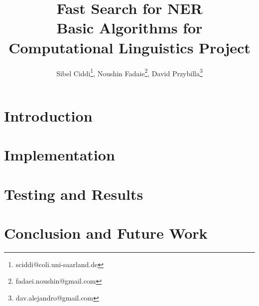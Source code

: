 \documentclass[4pt,a4paper]{article}
\author{Sibel Ciddi\footnote{sciddi@coli.uni-saarland.de},\hspace{5 mm} Noushin Fadaie\footnote{fadaei.noushin@gmail.com},\hspace{5 mm} David Przybilla\footnote{dav.alejandro@gmail.com}}
\title{Fast Search for NER\\Basic Algorithms for Computational Linguistics Project}
\begin{document}
\maketitle


\section{Introduction}
\label{sec:intro}


\section{Implementation}
\label{sec:implementation}


\section{Testing and Results}
\label{sec:results}


\section{Conclusion and Future Work}
\label{sec:conclusion}

\end{document}
